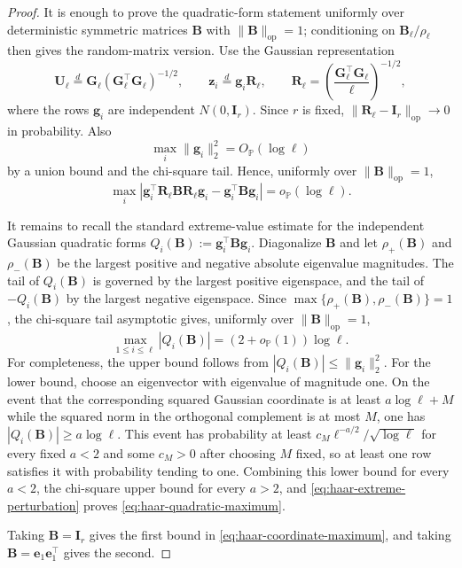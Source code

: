 \documentclass{article}
\newcommand{\Prob}{\mathbb{P}}
\newcommand{\op}{\operatorname{op}}
\newcommand{\bB}{\mathbf{B}}
\newcommand{\bU}{\mathbf{U}}
\newcommand{\be}{\mathbf{e}}
\theoremstyle{definition}
\theoremstyle{remark}
\begin{document}
\begin{proof}
It is enough to prove the quadratic-form statement uniformly over deterministic
symmetric matrices $\bB$ with $\|\bB\|_{\op}=1$; conditioning on
$\bB_\ell/\rho_\ell$ then gives the random-matrix version.  Use the Gaussian
representation
\[
    \bU_\ell
    \stackrel{d}{=}
    \mathbf G_\ell(\mathbf G_\ell^\top\mathbf G_\ell)^{-1/2},
    \qquad
    \mathbf z_i
    \stackrel{d}{=}
    \mathbf g_i\mathbf R_\ell,
    \qquad
    \mathbf R_\ell
    =
    \left(\frac{\mathbf G_\ell^\top\mathbf G_\ell}{\ell}\right)^{-1/2},
\]
where the rows $\mathbf g_i$ are independent $N(0,\mathbf I_r)$.  Since $r$ is
fixed, $\|\mathbf R_\ell-\mathbf I_r\|_{\op}\to0$ in probability.  Also
\[
    \max_i\|\mathbf g_i\|_2^2=O_{\Prob}(\log\ell)
\]
by a union bound and the chi-square tail.  Hence, uniformly over
$\|\bB\|_{\op}=1$,
\[
    \max_i
    \left|
    \mathbf g_i^\top\mathbf R_\ell\bB\mathbf R_\ell\mathbf g_i
    -
    \mathbf g_i^\top\bB\mathbf g_i
    \right|
    =
    o_{\Prob}(\log\ell).
    \label{eq:haar-extreme-perturbation}
\]

It remains to recall the standard extreme-value estimate for the independent
Gaussian quadratic forms
$Q_i(\bB):=\mathbf g_i^\top\bB\mathbf g_i$.  Diagonalize $\bB$ and let
$\rho_+(\bB)$ and $\rho_-(\bB)$ be the largest positive and negative absolute
eigenvalue magnitudes.  The tail of $Q_i(\bB)$ is governed by the largest
positive eigenspace, and the tail of $-Q_i(\bB)$ by the largest negative
eigenspace.  Since $\max\{\rho_+(\bB),\rho_-(\bB)\}=1$, the chi-square tail
asymptotic gives, uniformly over $\|\bB\|_{\op}=1$,
\[
    \max_{1\leq i\leq\ell}|Q_i(\bB)|
    =
    (2+o_{\Prob}(1))\log\ell.
\]
For completeness, the upper bound follows from
$|Q_i(\bB)|\leq\|\mathbf g_i\|_2^2$.  For the lower bound, choose an eigenvector
with eigenvalue of magnitude one.  On the event that the corresponding squared
Gaussian coordinate is at least $a\log\ell+M$ while the squared norm in the
orthogonal complement is at most $M$, one has
$|Q_i(\bB)|\geq a\log\ell$.  This event has probability at least
$c_M\ell^{-a/2}/\sqrt{\log\ell}$ for every fixed $a<2$ and some $c_M>0$ after
choosing $M$ fixed, so at least one row satisfies it with probability tending
to one.  Combining this lower bound for every $a<2$, the chi-square upper bound
for every $a>2$, and \eqref{eq:haar-extreme-perturbation} proves
\eqref{eq:haar-quadratic-maximum}.

Taking $\bB=\mathbf I_r$ gives the first bound in
\eqref{eq:haar-coordinate-maximum}, and taking $\bB=\be_1\be_1^\top$ gives the
second.
\end{proof}
\end{document}
